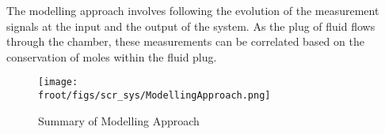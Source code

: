 The modelling approach involves following the evolution of the measurement signals at the input and the output of the
system. As the plug of fluid flows through the chamber, these measurements can be correlated based on the conservation
of moles within the fluid plug.

\begin{figure}[H]
    \centering
    \texttt{[image: \\froot/figs/scr\_sys/ModellingApproach.png]}
    \caption{Summary of Modelling Approach}
\end{figure}
